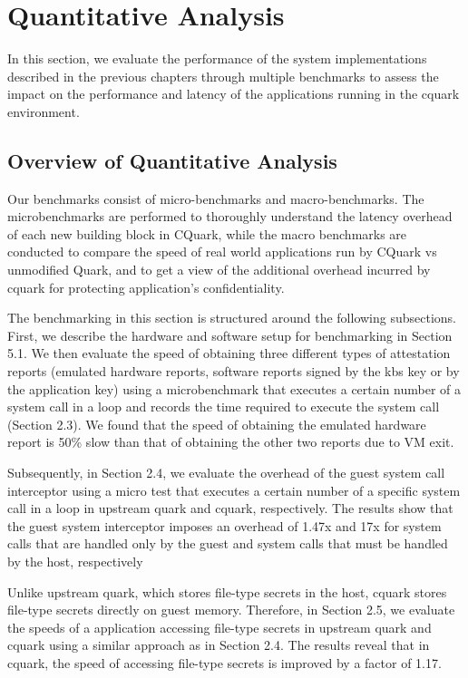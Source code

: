 \section{Quantitative Analysis}
In this section, we evaluate the performance of the system implementations described in the previous chapters through multiple benchmarks to assess the impact on the performance and latency of the applications running in the cquark environment.


\subsection{Overview of Quantitative Analysis}


Our benchmarks  consist of micro-benchmarks and macro-benchmarks. The microbenchmarks are performed to  thoroughly understand the latency overhead of each new building block in CQuark, while the macro benchmarks are conducted to compare the speed of 
real world applications run by CQuark vs unmodified Quark, and to get a view of the additional overhead incurred by cquark for protecting application’s confidentiality.


The benchmarking in this section is structured around the following subsections. First, we describe the hardware and software setup for benchmarking in Section 5.1. We then evaluate the speed of obtaining three different types of attestation reports (emulated hardware reports, software reports signed by the kbs key or by the application key) using a microbenchmark that executes a certain number of a system call in a loop and records the time required to execute the system call (Section 2.3). We found that the speed of obtaining the emulated hardware report is 50\% slow than that of obtaining the other two reports due to VM exit. 

Subsequently, in Section 2.4, we evaluate the overhead of the guest system call interceptor using a micro test that executes a certain number of a specific system call in a loop in upstream quark and cquark, respectively. The results show that the guest system interceptor imposes an overhead of 1.47x and 17x for system calls that are handled only by the guest and system calls that must be handled by the host, respectively

Unlike upstream quark, which stores file-type secrets in the host, cquark stores file-type secrets directly on guest memory. Therefore, in Section 2.5, we evaluate the speeds of a application accessing file-type secrets in upstream quark and cquark using a similar approach as in Section 2.4. The results reveal that in cquark, the speed of accessing file-type secrets is improved by a factor of 1.17.


